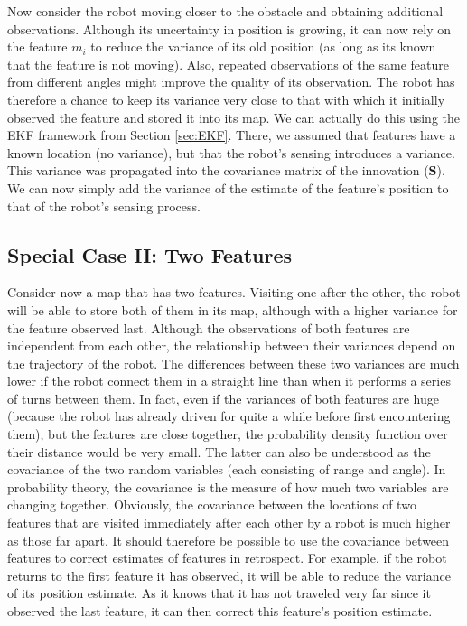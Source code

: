 \documentclass[paper=6.14in:9.21in,pagesize=pdftex,11pt,twoside,openright]{scrbook}
\begin{document}
Now consider the robot moving closer to the obstacle and obtaining additional observations. Although its uncertainty in position is growing, it can now rely on the feature $m_i$ to reduce the variance of its old position (as long as its known that the feature is not moving). Also, repeated observations of the same feature from different angles might improve the quality of its observation. The robot has therefore a chance to keep its variance very close to that with which it initially observed the feature and stored it into its map. We can actually do this using the EKF framework from Section \ref{sec:EKF}. There, we assumed that features have a known location (no variance), but that the robot's sensing introduces a variance. This variance was propagated into the covariance matrix of the innovation ($ \boldsymbol{S}$). We can now simply add the variance of the estimate of the feature's position to that of the robot's sensing process.

\subsection{Special Case II: Two Features}
Consider now a map that has two features. Visiting one after the other, the robot will be able to store both of them in its map, although with a higher variance for the feature observed last. Although the observations of both features are independent from each other, the relationship between their variances depend on the trajectory of the robot. The differences between these two variances are much lower if the robot connect them in a straight line than when it performs a series of turns between them. In fact, even if the variances of both features are huge (because the robot has already driven for quite a while before first encountering them), but the features are close together, the probability density function over their distance would be very small. The latter can also be understood as the covariance of the two random variables (each consisting of range and angle). In probability theory, the covariance is the measure of how much two variables are changing together. Obviously, the covariance between the locations of two features that are visited immediately after each other by a robot is much higher as those far apart. It should therefore be possible to use the covariance between features to correct estimates of features in retrospect. For example, if the robot returns to the first feature it has observed, it will be able to reduce the variance of its position estimate. As it knows that it has not traveled very far since it observed the last feature, it can then correct this feature's position estimate.
\end{document}
